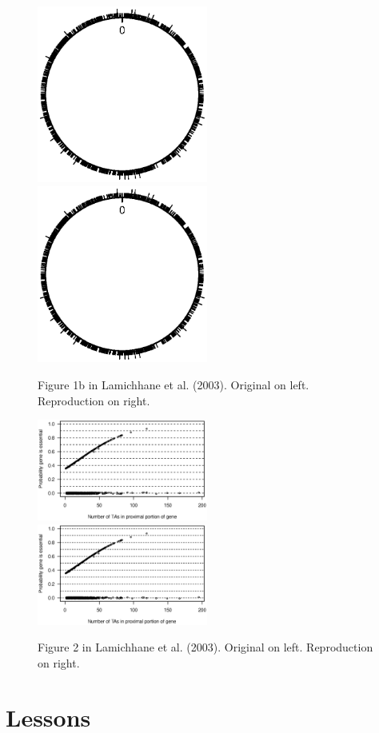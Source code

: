 \begin{figure}
\includegraphics[viewport=179 299 438 517, width=0.50\textwidth]{../talk/Figs/circlefig.ps}
\hfill
\includegraphics[viewport=179 299 438 517, width=0.50\textwidth]{../reproduction/Figs/circlefig.ps}

\caption{Figure 1b in Lamichhane et al. (2003). Original on left. Reproduction on right.\label{fig:fig1b}}
\end{figure}

\begin{figure}
\includegraphics[viewport=44 245 525 508, width=0.50\textwidth]{../original/Nov02/R/Figs/fig2.ps}
\hfill
\includegraphics[viewport=44 245 525 508, width=0.50\textwidth]{../reproduction/Figs/fig2.ps}

\caption{Figure 2 in Lamichhane et al. (2003). Original on left. Reproduction on right.\label{fig:fig2}}
\end{figure}


\section{Lessons}

